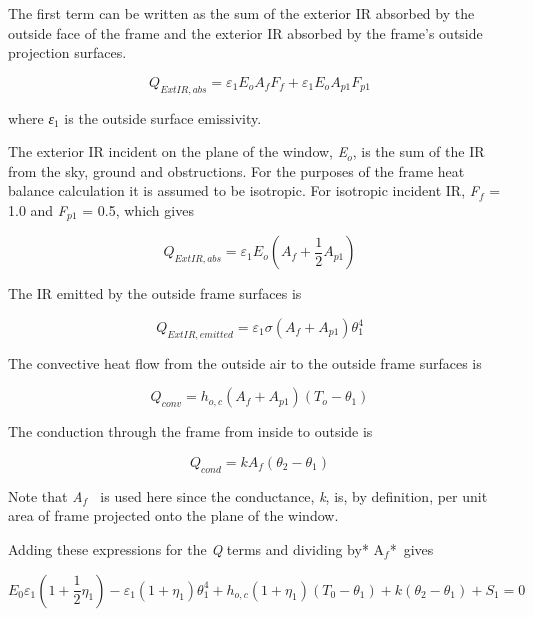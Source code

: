 The first term can be written as the sum of the exterior IR absorbed by the outside face of the frame and the exterior IR absorbed by the frame's outside projection surfaces.

\begin{equation}
{Q_{ExtIR,abs}} = {\varepsilon_1}{E_o}{A_f}{F_f} + {\varepsilon_1}{E_o}{A_{p1}}{F_{p1}}
\end{equation}

where \emph{ε\(_{1}\)} is the outside surface emissivity.

The exterior IR incident on the plane of the window, \emph{E\(_{o}\)}, is the sum of the IR from the sky, ground and obstructions. For the purposes of the frame heat balance calculation it is assumed to be isotropic. For isotropic incident IR, \emph{F\(_{f}\)} = 1.0 and \emph{F\(_{p1}\)} = 0.5, which gives

\begin{equation}
{Q_{ExtIR,abs}} = {\varepsilon_1}{E_o}({A_f} + \frac{1}{2}{A_{p1}})
\end{equation}

The IR emitted by the outside frame surfaces is

\begin{equation}
{Q_{ExtIR,emitted}} = {\varepsilon_1}\sigma ({A_f} + {A_{p1}})\theta_1^4
\end{equation}

The convective heat flow from the outside air to the outside frame surfaces is

\begin{equation}
{Q_{conv}} = {h_{o,c}}({A_f} + {A_{p1}})({T_o} - {\theta_1})
\end{equation}

The conduction through the frame from inside to outside is

\begin{equation}
{Q_{cond}} = k{A_f}({\theta_2} - {\theta_1})
\end{equation}

Note that \emph{A\(_{f}\) ~}is used here since the conductance, \emph{k}, is, by definition, per unit area of frame projected onto the plane of the window.

Adding these expressions for the \emph{Q} terms and dividing by* A\(_{f}\)*~gives

\begin{equation}
{E_0}{\varepsilon_1}\left( {1 + \frac{1}{2}{\eta_1}} \right) - {\varepsilon_1}\left( {1 + {\eta_1}} \right)\theta_1^4 + {h_{o,c}}\left( {1 + {\eta_1}} \right)\left( {{T_0} - {\theta_1}} \right) + k\left( {{\theta_2} - {\theta_1}} \right) + {S_1} = 0
\end{equation}

